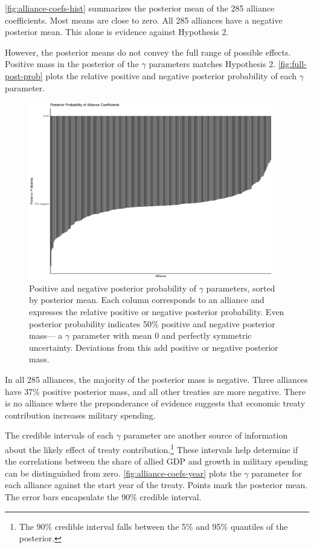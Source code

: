 \documentclass[12pt]{article}
\begin{document}
\autoref{fig:alliance-coefs-hist} summarizes the posterior mean of the 285 alliance coefficients. 
Most means are close to zero. 
All 285 alliances have a negative posterior mean. 
This alone is evidence against Hypothesis 2. 


However, the posterior means do not convey the full range of possible effects. 
Positive mass in the posterior of the $\gamma$ parameters matches Hypothesis 2. 
\autoref{fig:full-post-prob} plots the relative positive and negative posterior probability of each $\gamma$ parameter. 


\begin{figure}[htbp]
	\centering
		\includegraphics[width=0.95\textwidth]{full-post-prob.pdf}
	\caption{Positive and negative posterior probability of $\gamma$ parameters, sorted by posterior mean. Each column corresponds to an alliance and expresses the relative positive or negative posterior probability. Even posterior probability indicates 50\% positive and negative posterior mass--- a $\gamma$ parameter with mean 0 and perfectly symmetric uncertainty. Deviations from this add positive or negative posterior mass.}
	\label{fig:full-post-prob}
\end{figure}


In all 285 alliances, the majority of the posterior mass is negative.  
Three alliances have 37\% positive posterior mass, and all other treaties are more negative. 
There is no alliance where the preponderance of evidence suggests that economic treaty contribution increases military spending. 


The credible intervals of each $\gamma$ parameter are another source of information about the likely effect of treaty contribution.\footnote{The 90\% credible interval falls between the 5\% and 95\% quantiles of the posterior.} 
These intervals help determine if the correlations between the share of allied GDP and growth in military spending can be distinguished from zero. 
\autoref{fig:alliance-coefs-year} plots the $\gamma$ parameter for each alliance against the start year of the treaty.
Points mark the posterior mean. 
The error bars encapsulate the 90\% credible interval.
\end{document}
